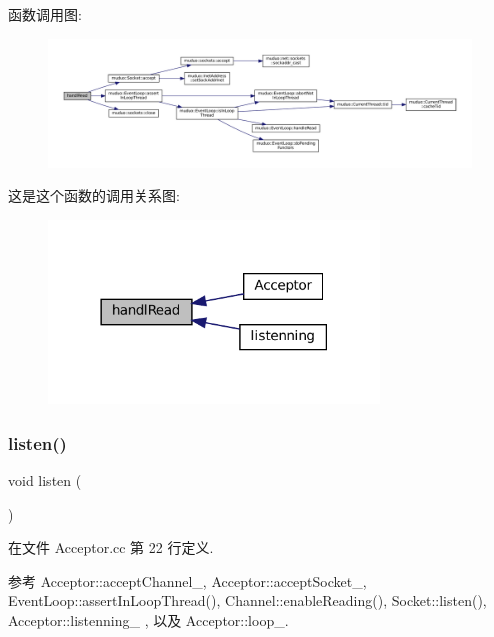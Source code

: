函数调用图\+:
\nopagebreak
\begin{figure}[H]
\begin{center}
\leavevmode
\includegraphics[width=350pt]{classmuduo_1_1Acceptor_a3459892d34c1eb51b40a53b8062237ca_cgraph}
\end{center}
\end{figure}
这是这个函数的调用关系图\+:
\nopagebreak
\begin{figure}[H]
\begin{center}
\leavevmode
\includegraphics[width=249pt]{classmuduo_1_1Acceptor_a3459892d34c1eb51b40a53b8062237ca_icgraph}
\end{center}
\end{figure}
\mbox{\label{classmuduo_1_1Acceptor_a458bbe4cf81360301586b2e62a7f9dd2}} 
\subsubsection{\texorpdfstring{listen()}{listen()}}
{\footnotesize\ttfamily void listen (\begin{DoxyParamCaption}{ }\end{DoxyParamCaption})}



在文件 Acceptor.\+cc 第 22 行定义.



参考 Acceptor\+::accept\+Channel\+\_\+, Acceptor\+::accept\+Socket\+\_\+, Event\+Loop\+::assert\+In\+Loop\+Thread(), Channel\+::enable\+Reading(), Socket\+::listen(), Acceptor\+::listenning\+\_\+ , 以及 Acceptor\+::loop\+\_\+.



